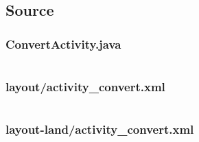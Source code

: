 \documentclass[11pt,english,numbers=endperiod,parskip=half]{scrartcl}
\begin{document}
\subsection{Source}
\subsubsection{ConvertActivity.java}
\inputminted{java}{../../Apps/HeightConvert/app/src/main/java/au/net/danielparker/heightconvert/ConvertActivity.java}

\subsubsection{layout/activity\_convert.xml}
\inputminted{xml}{../../Apps/HeightConvert/app/src/main/res/layout/activity_convert.xml}

\subsubsection{layout-land/activity\_convert.xml}
\inputminted{xml}{../../Apps/HeightConvert/app/src/main/res/layout-land/activity_convert.xml}
\end{document}
